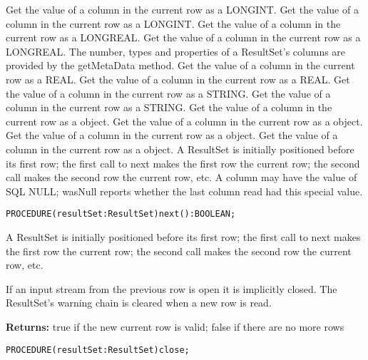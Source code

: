 \begin{description}
     Get the value of a column in the current row as a LONGINT. 
     Get the value of a column in the current row as a LONGINT. 
     Get the value of a column in the current row as a LONGREAL. 
     Get the value of a column in the current row as a LONGREAL. 
     The number, types and properties of a ResultSet's columns are provided by the getMetaData method. 
     Get the value of a column in the current row as a REAL. 
     Get the value of a column in the current row as a REAL. 
     Get the value of a column in the current row as a STRING. 
     Get the value of a column in the current row as a STRING. 
     Get the value of a column in the current row as a  object. 
     Get the value of a column in the current row as a  object. 
     Get the value of a column in the current row as a  object. 
     Get the value of a column in the current row as a  object. 
     A ResultSet is initially positioned before its first row; the first call to next makes the first row the current row; the second call makes
     the second row the current row, etc. 
     A column may have the value of SQL NULL; wasNull reports whether the last column read had this special value. 
\end{description}


\verb'PROCEDURE(resultSet:ResultSet)next():BOOLEAN;'

     A ResultSet is initially positioned before its first row; the first call to next makes the first row the current row; the second call makes
     the second row the current row, etc. 

     If an input stream from the previous row is open it is implicitly closed. The ResultSet's warning chain is cleared when a new row is
     read. 

     {\bf Returns: } 
          true if the new current row is valid; false if there are no more rows 


\verb'PROCEDURE(resultSet:ResultSet)close;'

